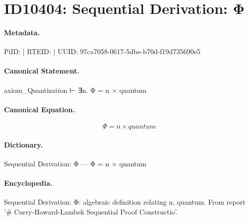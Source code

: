 \section*{ID10404: Sequential Derivation: Φ}
\paragraph{Metadata.}
PiID:  | RTEID:  | UUID: 97ca7058-0617-5dbe-b70d-f19d735690e5

\paragraph{Canonical Statement.}
axiom\_Quantization ⊢ ∃n. Φ = n × quantum

\paragraph{Canonical Equation.}
\[
Φ = n × quantum
\]

\paragraph{Dictionary.}
Sequential Derivation: Φ — Φ = n × quantum

\paragraph{Encyclopedia.}
Sequential Derivation: Φ: algebraic definition relating n, quantum. From report '\# Curry-Howard-Lambek Sequential Proof Constructio'.
